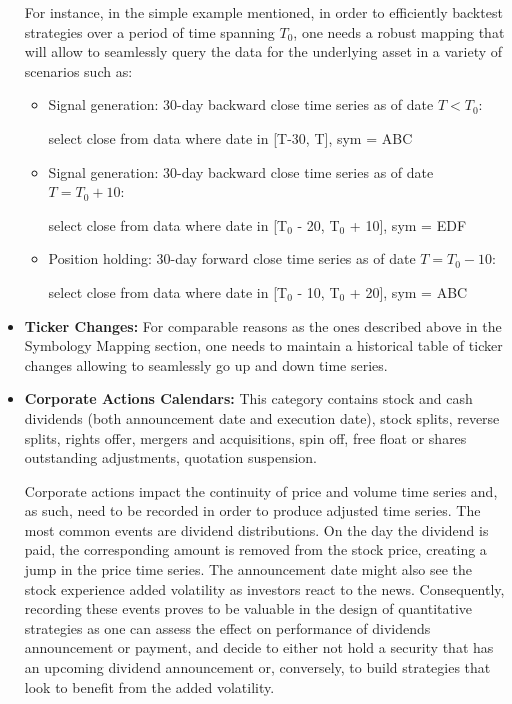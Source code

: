 \begin{itemize}
For instance, in the simple example mentioned, in order to efficiently backtest strategies over a period of time spanning $T_0$, one needs a robust mapping that will allow to seamlessly query the data for the underlying asset in a variety of scenarios such as:

\begin{itemize}
\item Signal generation: 30-day backward close time series as of date $T < T_0$: \par
{\ttfamily select close from data where date in [T-30,  T], sym = ABC}

\item Signal generation: 30-day backward close time series as of date $T= T_0+10$: \par
{\ttfamily select close from data where date in [T$_0$ - 20, T$_0$ + 10], sym = EDF}

\item Position holding: 30-day forward close time series as of date $T= T_0-10$: \par
{\ttfamily select close from data where date in [T$_0$ - 10,  T$_0$ + 20], sym = ABC}
\end{itemize}


\item \textbf{Ticker Changes:} For comparable reasons as the ones described above in the Symbology Mapping section, one needs to maintain a historical table of ticker changes allowing to seamlessly go up and down time series. 


\item \textbf{Corporate Actions Calendars:} This category contains stock and cash dividends (both announcement date and execution date), stock splits, reverse splits, rights offer, mergers and acquisitions, spin off, free float or shares outstanding adjustments, quotation suspension.


Corporate actions impact the continuity of price and volume time series and, as such, need to be recorded in order to produce adjusted time series. The most common events are dividend distributions. On the day the dividend is paid, the corresponding amount is removed from the stock price, creating a jump in the price time series. The announcement date might also see the stock experience added volatility as investors react to the news. Consequently, recording these events proves to be valuable in the design of quantitative strategies as one can assess the effect on performance of dividends announcement or payment, and decide to either not hold a security that has an upcoming dividend announcement or, conversely, to build strategies that look to benefit from the added volatility. 



\end{itemize}
